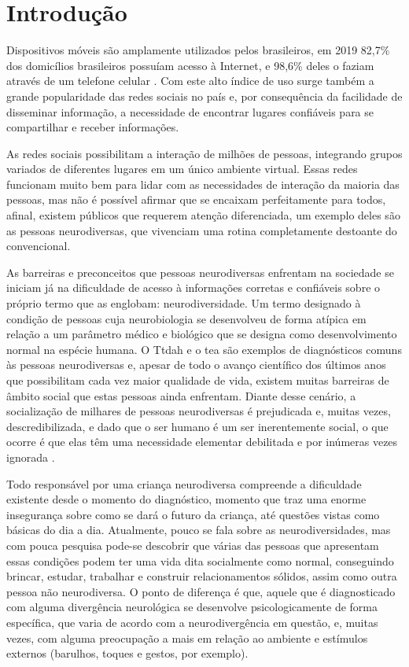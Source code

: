 
\chapter[Introdução]{Introdução}

Dispositivos móveis são amplamente utilizados pelos brasileiros, em 2019 82,7\% dos domicílios brasileiros possuíam acesso à Internet, e 98,6\% deles o faziam através de um telefone celular \cite{ibge2019}. Com este alto índice de uso surge também a grande popularidade das redes sociais no país e, por consequência da facilidade de disseminar informação, a necessidade de encontrar lugares confiáveis para se compartilhar e receber informações.

As redes sociais possibilitam a interação de milhões de pessoas, integrando grupos variados de diferentes lugares em um único ambiente virtual. Essas redes funcionam muito bem para lidar com as necessidades de interação da maioria das pessoas, mas não é possível afirmar que se encaixam perfeitamente para todos, afinal, existem públicos que requerem atenção diferenciada, um exemplo deles são as pessoas neurodiversas, que vivenciam uma rotina completamente destoante do convencional.

As barreiras e preconceitos que pessoas neurodiversas enfrentam na sociedade se iniciam já na dificuldade de acesso à informações corretas e confiáveis sobre o próprio termo que as englobam: neurodiversidade. Um termo designado à condição de pessoas cuja neurobiologia se desenvolveu de forma atípica em relação a um parâmetro médico e biológico que se designa como desenvolvimento normal na espécie humana. O T\ac{tdah} e o \ac{tea} são exemplos de diagnósticos comuns às pessoas neurodiversas e, apesar de todo o avanço científico dos últimos anos que possibilitam cada vez maior qualidade de vida, existem muitas barreiras de âmbito social que estas pessoas ainda enfrentam. Diante desse cenário, a socialização de milhares de pessoas neurodiversas é prejudicada e, muitas vezes, descredibilizada, e dado que o ser humano é um ser inerentemente social, o que ocorre é que elas têm uma necessidade elementar debilitada e por inúmeras vezes ignorada \cite{kanner43}.

Todo responsável por uma criança neurodiversa compreende a dificuldade existente desde o momento do diagnóstico, momento que traz uma enorme insegurança sobre como se dará o futuro da criança, até questões vistas como básicas do dia a dia. Atualmente, pouco se fala sobre as neurodiversidades, mas com pouca pesquisa pode-se descobrir que várias das pessoas que apresentam essas condições podem ter uma vida dita socialmente como normal, conseguindo brincar, estudar, trabalhar e construir relacionamentos sólidos, assim como outra pessoa não neurodiversa. O ponto de diferença é que, aquele que é diagnosticado com alguma divergência neurológica se desenvolve psicologicamente de forma específica, que varia de acordo com a neurodivergência em questão, e, muitas vezes, com alguma preocupação a mais em relação ao ambiente e estímulos externos (barulhos, toques e gestos, por exemplo). 

